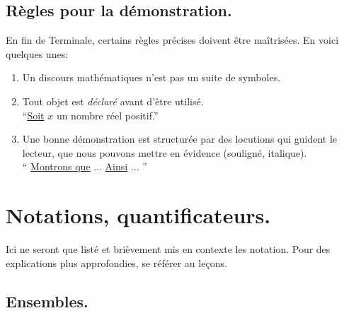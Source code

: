 \documentclass[12pt]{article}
\begin{document}
\subsection{Règles pour la démonstration.}
En fin de Terminale, certains règles précises doivent être maîtrisées. 
En voici quelques unes:
\begin{enumerate}
    \item Un discours mathématiques n'est pas un suite de symboles.
    \item Tout objet est \textit{déclaré} avant d'être utilisé. \\
        \Ex \enquote{\underline{Soit} $x$ un nombre réel positif.}
    \item Une bonne démonstration est structurée par des locutions 
    qui guident le lecteur, que nous pouvons mettre en évidence
    (souligné, italique). \\
        \Ex \enquote{
            \underline{Montrons que} ... 
            \underline{Ainsi} ...
        }
\end{enumerate}


\section{Notations, quantificateurs.}
Ici ne seront que listé et brièvement mis en contexte les notation.
Pour des explications plus approfondies, se référer au leçons.

\subsection{Ensembles.}
\end{document}
